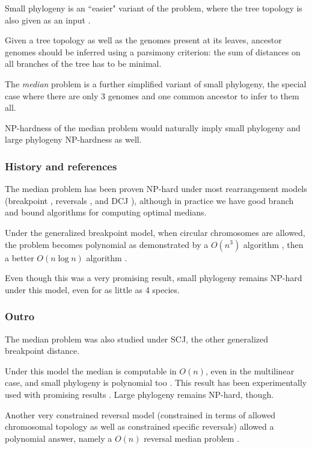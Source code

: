\documentclass[11pt,final,twoside,nofrench]{thlifl}
\begin{document}
Small phylogeny is an ``easier" variant of the problem, where the tree topology is also given as an input \cite{SB98}.

Given a tree topology as well as the genomes present at its leaves, ancestor genomes should be inferred using a parsimony criterion: the sum of distances on all branches of the tree has to be minimal.

The \emph{median} problem is a further simplified variant of small phylogeny, the special case where there are only 3 genomes and one common ancestor to infer to them all.

NP-hardness of the median problem would naturally imply small phylogeny and large phylogeny NP-hardness as well.

\subsubsection*{History and references}

The median problem has been proven NP-hard under most rearrangement models (breakpoint \cite{PS98,B98,TZS09}, reversals \cite{C03}, and DCJ \cite{TZS09}), although in practice we have good branch and bound algorithms for computing optimal medians.

Under the generalized breakpoint model, when circular chromosomes are allowed, the problem becomes polynomial as demonstrated by a $O(n^3)$ algorithm \cite{TZS09}, then a better $O(n \log n)$ algorithm \cite{K11}.

Even though this was a very promising result, small phylogeny remains NP-hard under this model, even for as little as 4 species.

\subsubsection*{Outro}

The median problem was also studied under SCJ, the other generalized breakpoint distance.

 Under this model the median is computable in $O(n)$, even in the multilinear case, and small phylogeny is polynomial too \cite{FM09,FM11}. This result has been experimentally used with promising results \cite{BFM13}. Large phylogeny remains NP-hard, though.

Another very constrained reversal model (constrained in terms of allowed chromosomal topology as well as constrained specific reversals) allowed a polynomial answer, namely a $O(n)$ reversal median problem \cite{OAHS05}.
\end{document}
